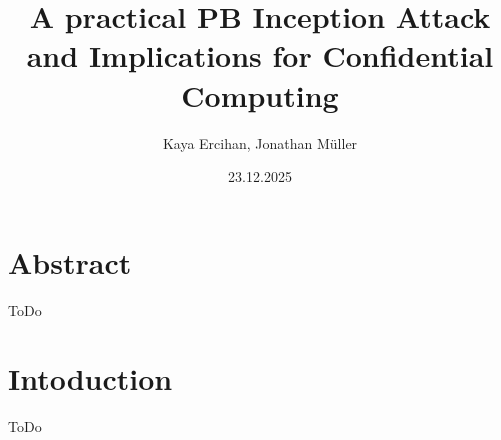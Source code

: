 \documentclass[11pt,a4paper]{article}
\title{A practical PB Inception Attack and Implications for Confidential Computing}
\author{Kaya Ercihan, Jonathan Müller}
\date{23.12.2025}
\begin{document}
\maketitle

% 
% 

\section*{Abstract}
ToDo

\section{Intoduction}
ToDo
\end{document}
